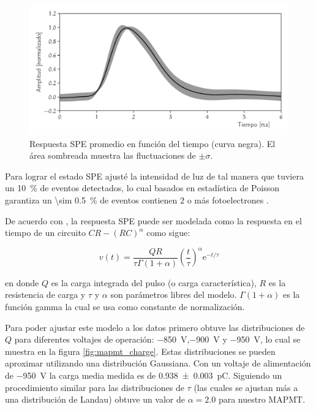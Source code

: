 \begin{figure}
        \centering
        \includegraphics[width=\textwidth]{sphe-signal.pdf}
        \caption{Respuesta SPE promedio en función del tiempo (curva negra). El área sombreada muestra las fluctuaciones de $\pm\sigma$.}
        \label{fig:sphe}
\end{figure}

Para lograr el estado SPE ajusté la intensidad de luz de tal manera que tuviera un \SI{10}{\percent} de eventos detectados, lo cual basados en estadística de Poisson garantiza un \SI{\sim 0.5}{\percent} de eventos contienen $2$ o más fotoelectrones \cite{barnhill08}.

De acuerdo con \cite{sanchez10}, la respuesta SPE puede ser modelada como la respuesta en el tiempo de un circuito $CR-(RC)^{\alpha}$ como sigue:

\begin{equation}
\label{equ:sphe}
v(t)=\frac{QR}{\tau\Gamma(1+\alpha)}\left(\frac{t}{\tau}\right)^{\alpha}\mathrm{e}^{-t/\tau}
\end{equation}

en donde $Q$ es la carga integrada del pulso (o carga característica), $R$ es la resistencia de carga y
$\tau$ y $\alpha$ son parámetros libres del modelo. $\Gamma(1+\alpha)$ es la función gamma la cual se usa como constante de normalización.

Para poder ajustar este modelo a los datos primero obtuve las distribuciones de $Q$ para diferentes voltajes de operación: \SI{-850}{\volt},\SI{-900}{\volt} y \SI{-950}{\volt}, lo cual se muestra en la figura \ref{fig:mapmt_charge}. Estas distribuciones se pueden aproximar utilizando una distribución Gaussiana. Con un voltaje de alimentación de \SI{-950}{\volt} la carga media medida es de \SI{0.938(3)}{\pico\coulomb}. Siguiendo un procedimiento similar para las distribuciones de $\tau$ (las cuales se ajustan más a una distribución de Landau) obtuve un valor de $\alpha=2.0$ para nuestro MAPMT.

